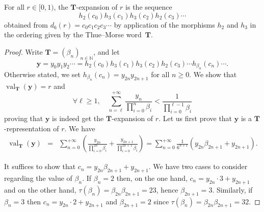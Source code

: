 \documentclass[10pt,a4paper]{amsart}
\DeclareMathOperator{\val}{val}
\begin{document}
\begin{theorem} \label{thm:TM23}
For all $r\in[0,1)$, the ${\mathbf{T}}$-expansion of $r$ is the sequence 
\[
    h_2(c_0)h_3(c_1)h_3(c_2)h_2(c_3)\cdots 
\]
obtained from $d_6(r)=c_0c_1c_2c_3\cdots$ by application of the morphisms $h_2$ and $h_3$ in the ordering given by the Thue--Morse word~${\mathbf{T}}$. 
\end{theorem}

\begin{proof}
Write ${\mathbf{T}}=(\beta_n)_{n\in\mathbb{N}}$, and let 
\[
    \mathbf{y}=y_0y_1y_2\cdots=h_2(c_0)h_3(c_1)h_3(c_2)h_2(c_3)\cdots h_{\beta_n}(c_n)\cdots.
\]
Otherwise stated, we set $h_{\beta_n}(c_n)=y_{2n}y_{2n+1}$ for all $n\ge 0$. We show that $\val_{\mathbf{T}}(\mathbf{y})=r$ and 
\[
    \forall\ell\ge 1,\quad  \sum_{n=\ell}^{+\infty} \frac{y_n}{\prod_{i=0}^n\beta_i}
    <\frac{1}{\prod_{i=0}^{\ell-1} \beta_i}
\]
proving that $\mathbf{y}$ is indeed get the ${\mathbf{T}}$-expansion of $r$. Let us first prove that $\mathbf{y}$ is a $\mathbf{T}$-representation of $r$. We have
\begin{eqnarray*}
    \val_{\mathbf{T}}(\mathbf{y}) 
    &=& \sum_{n= 0}^{+\infty}\left( \frac{y_{2n}}{\prod_{i=0}^{2n}\beta_i}
    +\frac{y_{2n+1}}{\prod_{i=0}^{2n+1}\beta_i}\right)
    =\sum_{n=0}^{+\infty}\frac{1}{6^{n+1}} (y_{2n}\beta_{2n+1}+y_{2n+1}).
\end{eqnarray*}

It suffices to show that $c_n=y_{2n}\beta_{2n+1}+y_{2n+1}$.
We have two cases to consider regarding the value of $\beta_n$. If $\beta_n=2$ then, on the one hand, $c_n= y_{2n}\cdot 3+y_{2n+1}$ and on the other hand, $\tau(\beta_n)=\beta_{2n}\beta_{2n+1}=23$, hence $\beta_{2n+1}=3$. Similarly, if $\beta_n=3$ then $c_n= y_{2n}\cdot 2+y_{2n+1}$ and $\beta_{2n+1}=2$ since $\tau(\beta_n)=\beta_{2n}\beta_{2n+1}=32$.


\end{proof}
\end{document}
